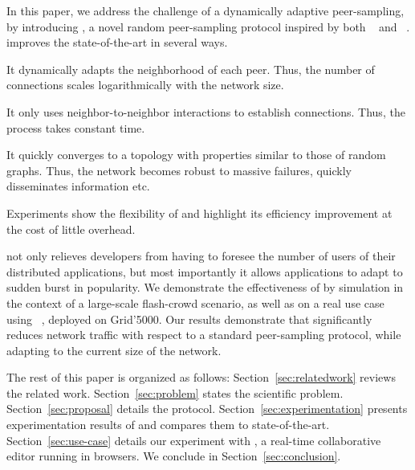 In this paper, we address the challenge of a dynamically adaptive
peer-sampling, by introducing \SPRAY, a novel random peer-sampling
protocol inspired by both \SCAMP~\cite{ganesh2003peer} and
\CYCLON~\cite{voulgaris2005cyclon}. \SPRAY improves the
state-of-the-art in several ways.
\begin{inparaenum}[(i)]
\item It dynamically adapts the neighborhood of each peer. Thus, the
  number of connections scales logarithmically with the network size.
\item It only uses neighbor-to-neighbor interactions to establish
  connections. Thus, the process takes constant time.
\item It quickly converges to a topology with properties similar to
  those of random graphs. Thus, the network becomes robust to massive
  failures, quickly disseminates information etc.
\item Experiments show the flexibility of \SPRAY and highlight its
  efficiency improvement at the cost of little overhead.
\end{inparaenum}

\SPRAY not only relieves developers from having to foresee the number
of users of their distributed applications, but most importantly it
allows applications to adapt to sudden burst in popularity. We
demonstrate the effectiveness of \SPRAY by simulation in the context
of a large-scale flash-crowd scenario, as well as on a real use case
using \CRATE~\cite{nedelec2016crate}, deployed on Grid'5000. Our
results demonstrate that \SPRAY significantly reduces network traffic
with respect to a standard peer-sampling protocol, while adapting to
the current size of the network.


The rest of this paper is organized as follows: Section~\ref{sec:relatedwork}
reviews the related work. Section~\ref{sec:problem} states the scientific
problem. Section~\ref{sec:proposal} details the \SPRAY
protocol. Section~\ref{sec:experimentation} presents experimentation results of
\SPRAY and compares them to state-of-the-art. Section~\ref{sec:use-case} details
our experiment with \CRATE, a real-time collaborative editor running in
browsers. We conclude in Section~\ref{sec:conclusion}.

